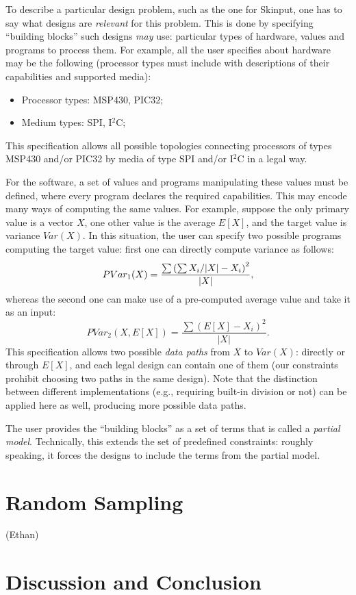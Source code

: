 \documentclass[conference]{IEEEtran}
\begin{document}
To describe a particular design problem, such as the one for Skinput, one has to say what designs are \emph{relevant} for this problem. This is done by specifying ``building blocks'' such designs \emph{may} use: particular types of hardware, values and programs to process them. For example, all the user specifies about hardware may be the following (processor types must include with descriptions of their capabilities and supported media):
\begin{itemize}
  \item Processor types: MSP430, PIC32;
  \item Medium types: SPI, I$^2$C;
\end{itemize}
This specification allows all possible topologies connecting processors of types MSP430 and/or PIC32 by media of type SPI and/or I$^2$C in a legal way.

For the software, a set of values and programs manipulating these values must be defined, where every program declares the required capabilities. This may encode many ways of computing the same values. For example, suppose the only primary value is a vector $X$, one other value is the average $E[X]$, and the target value is variance $Var(X)$. In this situation, the user can specify two possible programs computing the target value: first one can directly compute variance as follows:
$$PVar_1(X) = \frac{\sum \left( \sum X_i \middle/ |X| - X_i \right)^2}{|X|},$$
whereas the second one can make use of a pre-computed average value and take it as an input:
$$PVar_2(X, E[X]) = \frac{\sum \left( E[X] - X_i \right)^2}{|X|}.$$
This specification allows two possible \emph{data paths} from $X$ to $Var(X)$: directly or through $E[X]$, and each legal design can contain one of them (our constraints prohibit choosing two paths in the same design). Note that the distinction between different implementations (e.g., requiring built-in division or not) can be applied here as well, producing more possible data paths.

The user provides the ``building blocks'' as a set of terms that is called a \emph{partial model}. Technically, this extends the set of predefined constraints: roughly speaking, it forces the designs to include the terms from the partial model. 



\section{Random Sampling}
(Ethan)

\section{Discussion and Conclusion}




\end{document}
